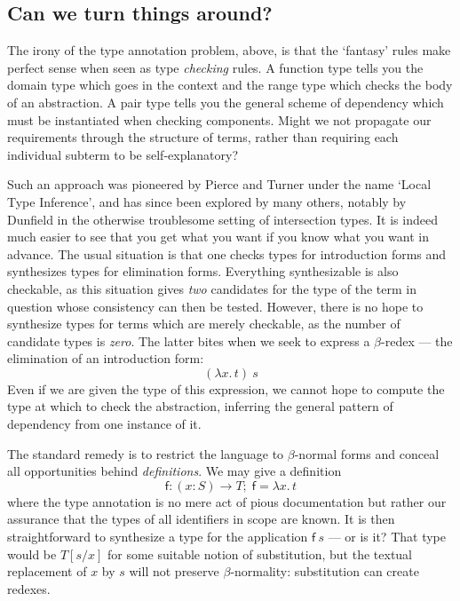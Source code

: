 \documentclass{jfp1}
\begin{document}
\subsection{Can we turn things around?}

The irony of the type annotation problem, above, is that the `fantasy' rules
make perfect sense when seen as type \emph{checking} rules. A function type
tells you the domain type which goes in the context and the range type which
checks the body of an abstraction. A pair type tells you the general scheme
of dependency which must be instantiated when checking components. Might we
not propagate our requirements through the structure of terms, rather than
requiring each individual subterm to be self-explanatory?

Such an approach was pioneered by Pierce and Turner under the name
`Local Type Inference', and has since been explored by many others,
notably by Dunfield in the otherwise troublesome setting of
intersection types. It is indeed much easier to see that you get what
you want if you know what you want in advance. The usual situation is
that one checks types for introduction forms and synthesizes types for
elimination forms. Everything synthesizable is also checkable, as this
situation gives \emph{two} candidates for the type of the term in
question whose consistency can then be tested. However, there is no
hope to synthesize types for terms which are merely checkable, as the
number of candidate types is \emph{zero}. The latter bites when we seek to
express a $\beta$-redex --- the elimination of an introduction form:
\[
  (\lambda x.\,t)\:s
\]
Even if we are given the type of this expression, we cannot hope
to compute the type at which to check the abstraction, inferring the
general pattern of dependency from one instance of it.

The standard remedy is to restrict the language to $\beta$-normal forms
and conceal all opportunities behind \emph{definitions}. We may give a definition
\[\mathsf{f} : (x\!:\!S)\to T;\; \mathsf{f} = \lambda x.\,t
  \]
where the type annotation is no mere act of pious documentation but rather our
assurance that the types of all identifiers in scope are known.
It is then straightforward to synthesize a type for the application $\mathsf{f}\:s$ --- or
is it? That type would be $T[s/x]$ for some suitable notion of substitution, but the textual
replacement of $x$ by $s$ will not preserve $\beta$-normality: substitution can create redexes.
\end{document}
